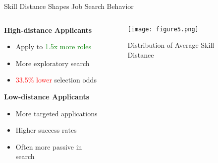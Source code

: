 \documentclass{beamer}
\begin{document}
\begin{frame}{Skill Distance Shapes Job Search Behavior}
\begin{columns}
\begin{column}{0.48\textwidth}
\textbf{High-distance Applicants}
\begin{itemize}
    \item Apply to \textcolor{green}{1.5x more roles}
    \item More exploratory search
    \item \textcolor{red}{33.5\% lower} selection odds
\end{itemize}

\textbf{Low-distance Applicants}
\begin{itemize}
    \item More targeted applications
    \item Higher success rates
    \item Often more passive in search
\end{itemize}
\end{column}
\begin{column}{0.48\textwidth}
\begin{figure}
\centering
\texttt{[image: figure5.png]}
\caption*{Distribution of Average Skill Distance}
\end{figure}
\end{column}
\end{columns}
\end{frame}
\end{document}
